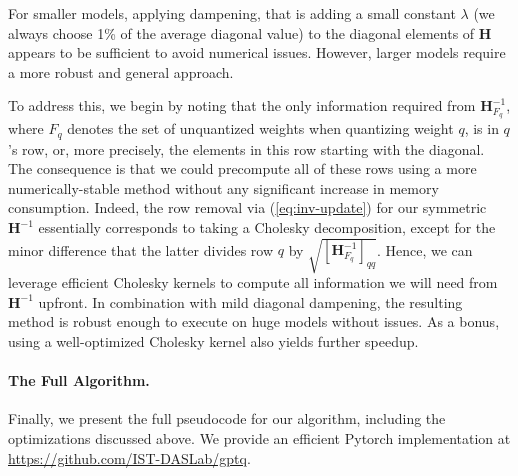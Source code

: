 For smaller models, applying dampening, that is adding a small constant $\lambda$ (we always choose 1\% of the average diagonal value) to the diagonal elements of $\mathbf{H}$ appears to be sufficient to avoid numerical issues. However, larger models require a more robust and general approach.

To address this, we begin by noting that the only information required from $\mathbf{H}_{F_q}^{-1}$, where $F_q$ denotes the set of unquantized weights when quantizing weight $q$, is in $q$'s row, or, more precisely, the elements in this row starting with the diagonal. The consequence is that we could precompute all of these rows using a more numerically-stable method without any significant increase in memory consumption. 
Indeed, the row removal via (\ref{eq:inv-update}) for our symmetric $\mathbf{H}^{-1}$ essentially corresponds to taking a Cholesky decomposition, except for the minor difference that the latter divides row $q$ by $\sqrt{[\mathbf{H}^{-1}_{F_q}]_{qq}}$. Hence, we can leverage efficient Cholesky kernels to compute all information we will need from $\mathbf{H}^{-1}$ upfront. In combination with mild diagonal dampening, the resulting method is robust enough to execute on huge models without issues. As a bonus, using a well-optimized Cholesky kernel also yields further speedup. 

\paragraph{The Full Algorithm.}
Finally, we present the full pseudocode for our algorithm, including the optimizations discussed above. We provide an efficient Pytorch implementation at \url{https://github.com/IST-DASLab/gptq}.

\newlength{\commentindent}
\setlength{\commentindent}{.5\textwidth}
\makeatletter
\renewcommand{\algorithmiccomment}[1]{\unskip\hfill\makebox[\commentindent][l]{\textit{//~#1}}\par}
\LetLtxMacro{\oldalgorithmic}{\algorithmic}
\renewcommand{\algorithmic}[1][0]{%
  \oldalgorithmic[#1]%
  \renewcommand{\ALC@com}[1]{%
    \ifnum\pdfstrcmp{##1}{default}=0\else\algorithmiccomment{##1}\fi}%
}
\makeatother


